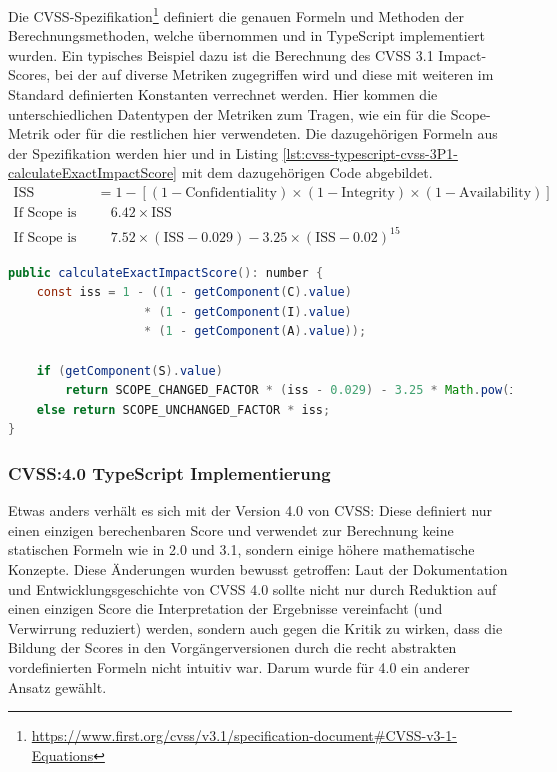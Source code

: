 Die CVSS-Spezifikation\footnote{\url{https://www.first.org/cvss/v3.1/specification-document\#CVSS-v3-1-Equations}} definiert die genauen Formeln und Methoden der Berechnungsmethoden, welche übernommen und in TypeScript implementiert wurden.
Ein typisches Beispiel dazu ist die Berechnung des CVSS 3.1 Impact-Scores, bei der auf diverse Metriken zugegriffen wird und diese mit weiteren im Standard definierten Konstanten verrechnet werden.
Hier kommen die unterschiedlichen Datentypen der Metriken zum Tragen, wie ein  für die Scope-Metrik oder  für die restlichen hier verwendeten.
Die dazugehörigen Formeln aus der Spezifikation werden hier und in Listing \ref{lst:cvss-typescript-cvss-3P1-calculateExactImpactScore} mit dem dazugehörigen Code abgebildet.
\begin{align*}
    \text{ISS} &= 1 - [ (1 - \text{Confidentiality}) \times (1 - \text{Integrity}) \times (1 - \text{Availability}) ] \\
    \text{If Scope is Unchanged:} & \quad 6.42 \times \text{ISS} \\
    \text{If Scope is Changed:} & \quad 7.52 \times (\text{ISS} - 0.029) - 3.25 \times (\text{ISS} - 0.02)^{15}
\end{align*}

\begin{lstlisting}[language=Java, label={lst:cvss-typescript-cvss-3P1-calculateExactImpactScore}, caption={CVSS 3.1 Impact Score-Berechnung in TypeScript}, basicstyle=\scriptsize]
public calculateExactImpactScore(): number {
    const iss = 1 - ((1 - getComponent(C).value)
                   * (1 - getComponent(I).value)
                   * (1 - getComponent(A).value));

    if (getComponent(S).value)
        return SCOPE_CHANGED_FACTOR * (iss - 0.029) - 3.25 * Math.pow(iss - 0.02, 15);
    else return SCOPE_UNCHANGED_FACTOR * iss;
}
\end{lstlisting}

\subsubsection{CVSS:4.0 TypeScript Implementierung} \label{subsec:projektbericht-loesungsweg-typescript-cvss-online-calculator-cvss-4P0}

Etwas anders verhält es sich mit der Version 4.0 von CVSS:
Diese definiert nur einen einzigen berechenbaren Score und verwendet zur Berechnung keine statischen Formeln wie in 2.0 und 3.1, sondern einige höhere mathematische Konzepte.
Diese Änderungen wurden bewusst getroffen:
Laut der Dokumentation und Entwicklungsgeschichte von CVSS 4.0 \cite{CVSSv4.0Specification} sollte nicht nur durch Reduktion auf einen einzigen Score die Interpretation der Ergebnisse vereinfacht (und Verwirrung reduziert) werden, sondern auch gegen die Kritik zu wirken, dass die Bildung der Scores in den Vorgängerversionen durch die recht abstrakten vordefinierten Formeln nicht intuitiv war.
Darum wurde für 4.0 ein anderer Ansatz gewählt.


